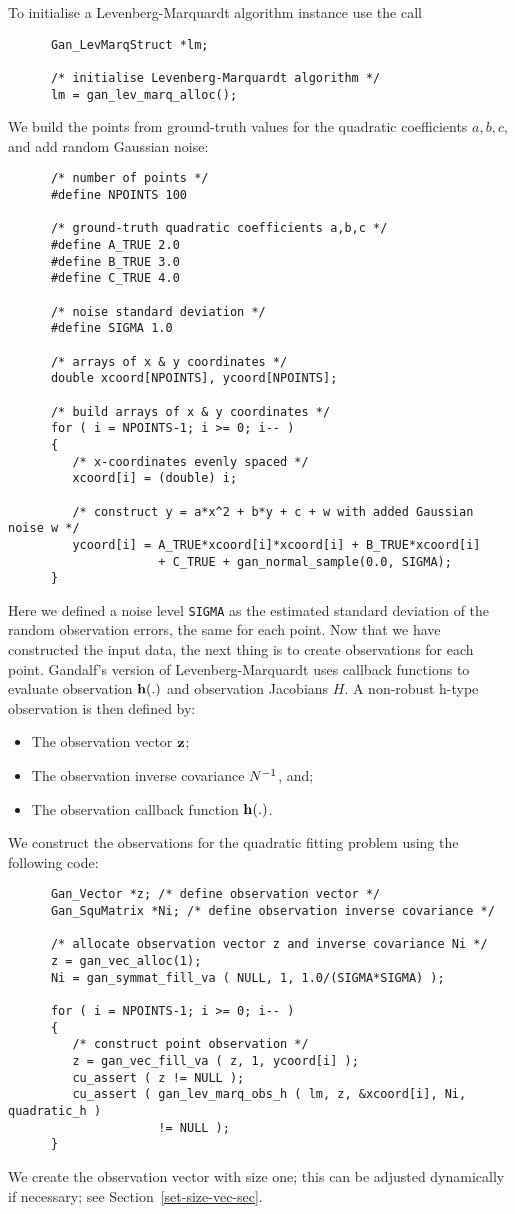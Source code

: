 To initialise a Levenberg-Marquardt algorithm instance use the call
\begin{verbatim}
      Gan_LevMarqStruct *lm;

      /* initialise Levenberg-Marquardt algorithm */
      lm = gan_lev_marq_alloc();
\end{verbatim}
We build the points from ground-truth values for the quadratic coefficients
$a,b,c$, and add random Gaussian noise:
\begin{verbatim}
      /* number of points */
      #define NPOINTS 100

      /* ground-truth quadratic coefficients a,b,c */
      #define A_TRUE 2.0
      #define B_TRUE 3.0
      #define C_TRUE 4.0

      /* noise standard deviation */
      #define SIGMA 1.0

      /* arrays of x & y coordinates */
      double xcoord[NPOINTS], ycoord[NPOINTS];

      /* build arrays of x & y coordinates */
      for ( i = NPOINTS-1; i >= 0; i-- )
      {
         /* x-coordinates evenly spaced */
         xcoord[i] = (double) i;

         /* construct y = a*x^2 + b*y + c + w with added Gaussian noise w */
         ycoord[i] = A_TRUE*xcoord[i]*xcoord[i] + B_TRUE*xcoord[i]
                     + C_TRUE + gan_normal_sample(0.0, SIGMA);
      }
\end{verbatim}
Here we defined a noise level {\tt SIGMA} as the estimated standard deviation
of the random observation errors, the same for each point.
Now that we have constructed the input data, the next thing is to create
observations for each point.
Gandalf's version of Levenberg-Marquardt uses callback functions to
evaluate observation ${\bf h}(.)$ and observation Jacobians $H$.
A non-robust h-type observation is then defined by:
\begin{itemize}
  \item The observation vector ${\bf z}$;
  \item The observation inverse covariance $N^{-1}$, and;
  \item The observation callback function ${\bf h}(.)$.
\end{itemize}
We construct the observations for the quadratic fitting problem using the
following code:
\begin{verbatim}
      Gan_Vector *z; /* define observation vector */
      Gan_SquMatrix *Ni; /* define observation inverse covariance */

      /* allocate observation vector z and inverse covariance Ni */
      z = gan_vec_alloc(1);
      Ni = gan_symmat_fill_va ( NULL, 1, 1.0/(SIGMA*SIGMA) );

      for ( i = NPOINTS-1; i >= 0; i-- )
      {
         /* construct point observation */
         z = gan_vec_fill_va ( z, 1, ycoord[i] );
         cu_assert ( z != NULL );
         cu_assert ( gan_lev_marq_obs_h ( lm, z, &xcoord[i], Ni, quadratic_h )
                     != NULL );
      }
\end{verbatim}
We create the observation vector with size one; this can be adjusted
dynamically if necessary; see Section~\ref{set-size-vec-sec}.

